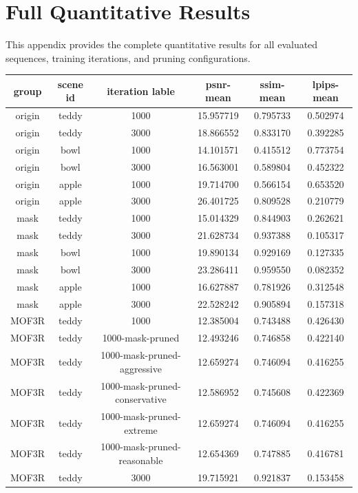 \section{Full Quantitative Results}
\label{sec:full_result}

This appendix provides the complete quantitative results
for all evaluated sequences, training iterations, and
pruning configurations.

\begin{table}[h!]
    \centering
    \begin{tabular}{c|c|c|c|c|c} \toprule
group & scene id & iteration lable & psnr-mean & ssim-mean & lpips-mean \\ \midrule
origin & teddy & 1000 & 15.957719 & 0.795733 & 0.502974 \\
origin & teddy & 3000 & 18.866552 & 0.833170 & 0.392285 \\
origin & bowl & 1000 & 14.101571 & 0.415512 & 0.773754 \\
origin & bowl & 3000 & 16.563001 & 0.589804 & 0.452322 \\
origin & apple & 1000 & 19.714700 & 0.566154 & 0.653520 \\
origin & apple & 3000 & 26.401725 & 0.809528 & 0.210779 \\
mask & teddy & 1000 & 15.014329 & 0.844903 & 0.262621 \\
mask & teddy & 3000 & 21.628734 & 0.937388 & 0.105317 \\
mask & bowl & 1000 & 19.890134 & 0.929169 & 0.127335 \\
mask & bowl & 3000 & 23.286411 & 0.959550 & 0.082352 \\
mask & apple & 1000 & 16.627887 & 0.781926 & 0.312548 \\
mask & apple & 3000 & 22.528242 & 0.905894 & 0.157318 \\
MOF3R & teddy & 1000 & 12.385004 & 0.743488 & 0.426430 \\
MOF3R & teddy & 1000-mask-pruned & 12.493246 & 0.746858 & 0.422140 \\
MOF3R & teddy & 1000-mask-pruned-aggressive & 12.659274 & 0.746094 & 0.416255 \\
MOF3R & teddy & 1000-mask-pruned-conservative & 12.586952 & 0.745608 & 0.422369 \\
MOF3R & teddy & 1000-mask-pruned-extreme & 12.659274 & 0.746094 & 0.416255 \\
MOF3R & teddy & 1000-mask-pruned-reasonable & 12.654369 & 0.747885 & 0.416781 \\
MOF3R & teddy & 3000 & 19.715921 & 0.921837 & 0.153458 \\

\end{tabular}
\end{table}
